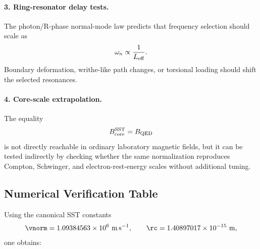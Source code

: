     \paragraph{3. Ring-resonator delay tests.}
        The photon/R-phase normal-mode law predicts that frequency selection
        should scale as
        \[
            \omega_n
            \propto
            \frac{1}{L_{\rm eff}}.
        \]
        Boundary deformation, writhe-like path changes, or torsional loading
        should shift the selected resonances.
    
    \paragraph{4. Core-scale extrapolation.}
        The equality
        \[
            B_{\rm core}^{\rm SST}=B_{\rm QED}
        \]
        is not directly reachable in ordinary laboratory magnetic fields, but it
        can be tested indirectly by checking whether the same normalization
        reproduces Compton, Schwinger, and electron-rest-energy scales without
        additional tuning.

\subsection{Numerical Verification Table}

Using the canonical SST constants
\[
    \vnorm=1.09384563\times10^6\ {\rm m\,s^{-1}},
    \qquad
    \rc=1.40897017\times10^{-15}\ {\rm m},
\]
one obtains:

